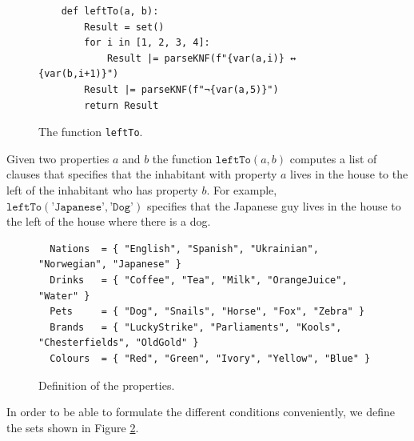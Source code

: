 \begin{figure}[!ht]
\centering
\begin{verbatim}
    def leftTo(a, b):
        Result = set()
        for i in [1, 2, 3, 4]:
            Result |= parseKNF(f"{var(a,i)} ↔ {var(b,i+1)}")
        Result |= parseKNF(f"¬{var(a,5)}")
        return Result
\end{verbatim}
\vspace*{-0.3cm}
\caption{The function \texttt{leftTo}.}
\label{fig:leftTo}
\end{figure}

Given two properties $a$ and $b$ the function $\texttt{leftTo}(a, b)$ computes a
list of clauses that specifies that the inhabitant with property $a$ lives in
the house to the left of the inhabitant who has property $b$.  For example,
$\texttt{leftTo}(\texttt{'Japanese'}, \texttt{'Dog'})$ specifies that the
Japanese guy lives in the house to the left of the house where there is a dog.

\begin{figure}[!ht]
\centering
\begin{verbatim}
  Nations  = { "English", "Spanish", "Ukrainian", "Norwegian", "Japanese" }
  Drinks   = { "Coffee", "Tea", "Milk", "OrangeJuice", "Water" }
  Pets     = { "Dog", "Snails", "Horse", "Fox", "Zebra" }
  Brands   = { "LuckyStrike", "Parliaments", "Kools", "Chesterfields", "OldGold" }
  Colours  = { "Red", "Green", "Ivory", "Yellow", "Blue" }                
\end{verbatim}
\vspace*{-0.3cm}
\caption{Definition of the properties.}
\label{fig:properties}
\end{figure}

In order to be able to formulate the different conditions conveniently, we define the sets
shown in Figure \ref{fig:properties}.

